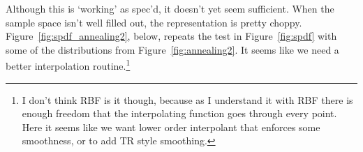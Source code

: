 \documentclass{tufte-handout}
\begin{document}
Although this is `working' as spec'd, it doesn't yet seem sufficient. When the
sample space isn't well filled out, the representation is pretty choppy.
Figure~\ref{fig:spdf_annealing2}, below, repeats the test in
Figure~\ref{fig:spdf} with some of the distributions from
Figure~\ref{fig:annealing2}. It seems like we need a better interpolation
routine.\footnote{I don't think RBF is it though, because as I understand it
    with RBF there is enough freedom that the interpolating function goes
    through every point. Here it seems like we want lower order interpolant
that enforces some smoothness, or to add TR style smoothing. }
\end{document}
